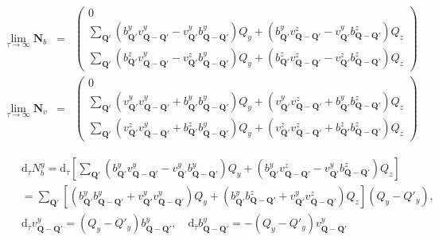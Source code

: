 \documentclass[a4paper,11pt]{article}
\begin{document}
\begin{eqnarray}
 \lim\limits_{\tau \rightarrow \infty}{\mathbf{N}_b} &=&
\left(\begin{array}{c}
 0  \\
 \sum_{\mathbf{Q}'} (b_{\mathbf{Q}'}^yv_{\mathbf{Q}-\mathbf{Q}'}^y - v_{\mathbf{Q}'}^yb_{\mathbf{Q}-\mathbf{Q}'}^y)Q_y + (b_{\mathbf{Q}'}^yv_{\mathbf{Q}-\mathbf{Q}'}^z - v_{\mathbf{Q}'}^yb_{\mathbf{Q}-\mathbf{Q}'}^z)Q_z  \\
 \sum_{\mathbf{Q}'} (b_{\mathbf{Q}'}^zv_{\mathbf{Q}-\mathbf{Q}'}^y - v_{\mathbf{Q}'}^zb_{\mathbf{Q}-\mathbf{Q}'}^y)Q_y + (b_{\mathbf{Q}'}^zv_{\mathbf{Q}-\mathbf{Q}'}^z - v_{\mathbf{Q}'}^zb_{\mathbf{Q}-\mathbf{Q}'}^z)Q_z \end{array} \right) \\
  \lim\limits_{\tau \rightarrow \infty}{\mathbf{N}_v} &=&
\left(\begin{array}{c}
 0  \\
 \sum_{\mathbf{Q}'} (v_{\mathbf{Q}'}^yv_{\mathbf{Q}-\mathbf{Q}'}^y + b_{\mathbf{Q}'}^yb_{\mathbf{Q}-\mathbf{Q}'}^y)Q_y + (v_{\mathbf{Q}'}^yv_{\mathbf{Q}-\mathbf{Q}'}^z + b_{\mathbf{Q}'}^yb_{\mathbf{Q}-\mathbf{Q}'}^z)Q_z \\
 \sum_{\mathbf{Q}'} (v_{\mathbf{Q}'}^zv_{\mathbf{Q}-\mathbf{Q}'}^y + b_{\mathbf{Q}'}^zb_{\mathbf{Q}-\mathbf{Q}'}^y)Q_y + (v_{\mathbf{Q}'}^zv_{\mathbf{Q}-\mathbf{Q}'}^z + b_{\mathbf{Q}'}^zb_{\mathbf{Q}-\mathbf{Q}'}^z)Q_z \end{array} \right)
\end{eqnarray}


\begin{eqnarray*}
&&\mathrm{d}_{\overline{\tau}}N_b^y = \mathrm{d}_{\overline{\tau}}\left[\sum_{\mathbf{Q}'} (b_{\mathbf{Q}'}^yv_{\mathbf{Q}-\mathbf{Q}'}^y - v_{\mathbf{Q}'}^yb_{\mathbf{Q}-\mathbf{Q}'}^y)Q_y + (b_{\mathbf{Q}'}^yv_{\mathbf{Q}-\mathbf{Q}'}^z - v_{\mathbf{Q}'}^yb_{\mathbf{Q}-\mathbf{Q}'}^z)Q_z \right] \\
&& =\sum_{\mathbf{Q}'} [(b_{\mathbf{Q}'}^yb_{\mathbf{Q}-\mathbf{Q}'}^y + v_{\mathbf{Q}'}^yv_{\mathbf{Q}-\mathbf{Q}'}^y)Q_y + (b_{\mathbf{Q}'}^yb_{\mathbf{Q}-\mathbf{Q}'}^z + v_{\mathbf{Q}'}^yv_{\mathbf{Q}-\mathbf{Q}'}^z)Q_z](Q_y-Q'_y) ,  \\
&&\mathrm{d}_{\overline{\tau}} v_{\mathbf{Q}-\mathbf{Q}'}^y = (Q_y-Q'_y)b_{\mathbf{Q}-\mathbf{Q}'}^y,\quad \mathrm{d}_{\overline{\tau}} b_{\mathbf{Q}-\mathbf{Q}'}^y = -(Q_y-Q'_y)v_{\mathbf{Q}-\mathbf{Q}'}^y \nonumber
\end{eqnarray*}
  
\end{document}
